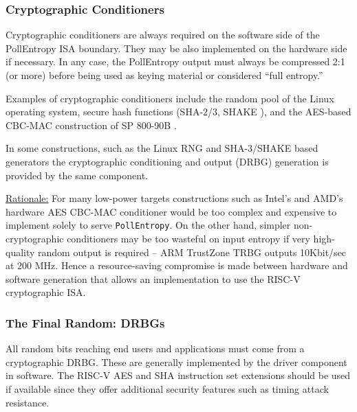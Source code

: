\subsubsection{Cryptographic Conditioners}
\label{sec:crypto-cond}

    Cryptographic conditioners are always required on the software side of
    the PollEntropy ISA boundary. They may be also implemented on the
    hardware side if necessary. In any case, the PollEntropy output must
    always be compressed 2:1 (or more) before being used as keying material
    or considered ``full entropy.''

    Examples of cryptographic conditioners include the random pool
    of the Linux operating system, secure hash functions (SHA-2/3,
    SHAKE \cite{NI15,NI15A} ),
    and the AES-based CBC-MAC construction of SP 800-90B \cite{TuBaKe+18}.

    In some constructions, such as the Linux RNG and SHA-3/SHAKE \cite{NI15}
    based generators the cryptographic conditioning and output (DRBG)
    generation is provided by the same component.

    \underline{Rationale:}
    For many low-power targets constructions such as Intel's
    \cite{Me18} and AMD's \cite{AM17} hardware AES CBC-MAC conditioner
    would be too complex and expensive to implement solely to serve
    \verb|PollEntropy|. On the other hand, simpler non-cryptographic
    conditioners may be too wasteful on input entropy if very high-quality
    random output is required -- ARM TrustZone TRBG \cite{AR17}
    outputs 10Kbit/sec at 200 MHz. Hence a resource-saving compromise is
    made between hardware and software generation that allows an
    implementation to use the RISC-V cryptographic ISA.


\subsubsection{The Final Random: DRBGs}
\label{sec:drbgs}

    All random bits reaching end users and applications must come from a
    cryptographic DRBG. These are generally implemented by the driver
    component in software. The RISC-V AES and SHA instruction set
    extensions should be used if available since they
    offer additional security features such as timing attack resistance.

